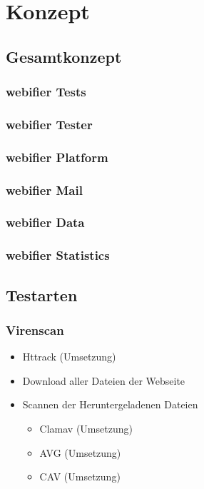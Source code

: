 \chapter{Konzept}

\section{Gesamtkonzept}

\subsection{webifier Tests}

\subsection{webifier Tester}

\subsection{webifier Platform}

\subsection{webifier Mail}

\subsection{webifier Data}

\subsection{webifier Statistics}

\section{Testarten}

\subsection{Virenscan}
\begin{itemize}
  \item Httrack (Umsetzung)
  \item Download aller Dateien der Webseite
  \item Scannen der Heruntergeladenen Dateien
  \begin{itemize}
    \item Clamav (Umsetzung)
    \item AVG (Umsetzung)
    \item CAV (Umsetzung)
  \end{itemize}
\end{itemize}

